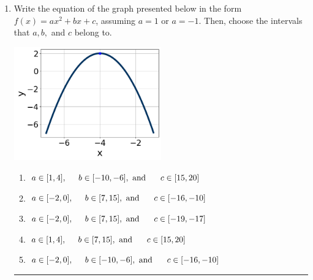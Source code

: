 \documentclass[14pt]{extbook}
\newcommand{\litem}[1]{\item#1\hspace*{-1cm}\rule{\textwidth}{0.4pt}}
\begin{document}
\begin{enumerate}
{\begin{enumerate}[label=\Alph*.]
\end{enumerate} }
\litem{
Write the equation of the graph presented below in the form $f(x)=ax^2+bx+c$, assuming  $a=1$ or $a=-1$. Then, choose the intervals that $a, b,$ and $c$ belong to.
\begin{center}
    \includegraphics[width=0.5\textwidth]{../Figures/quadraticGraphToEquationC.png}
\end{center}
\begin{enumerate}[label=\Alph*.]
\item \( a \in [1, 4], \hspace*{5mm} b \in [-10, -6], \text{ and } \hspace*{5mm} c \in [15, 20] \)
\item \( a \in [-2, 0], \hspace*{5mm} b \in [7, 15], \text{ and } \hspace*{5mm} c \in [-16, -10] \)
\item \( a \in [-2, 0], \hspace*{5mm} b \in [7, 15], \text{ and } \hspace*{5mm} c \in [-19, -17] \)
\item \( a \in [1, 4], \hspace*{5mm} b \in [7, 15], \text{ and } \hspace*{5mm} c \in [15, 20] \)
\item \( a \in [-2, 0], \hspace*{5mm} b \in [-10, -6], \text{ and } \hspace*{5mm} c \in [-16, -10] \)

\end{enumerate} }
\end{enumerate}
\end{document}
